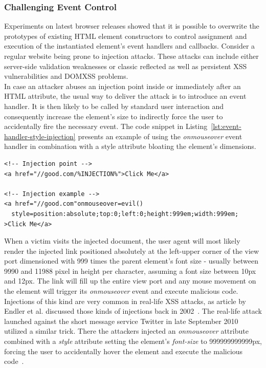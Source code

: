       \subsubsection{Challenging Event Control}
      \label{subsubsubsec:6.6.4.2_event_control}

      Experiments on latest browser releases showed that it is possible to overwrite the prototypes of existing HTML element constructors to control assignment and execution of the instantiated element's event handlers and callbacks. Consider a regular website being prone to injection attacks. These attacks can include either server-side validation weaknesses or classic reflected as well as persistent XSS vulnerabilities and DOMXSS problems. \\

      In case an attacker abuses an injection point inside or immediately after an HTML attribute, the usual way to deliver the attack is to introduce an event handler. It is then likely to be called by standard user interaction and consequently increase the element's size to indirectly force the user to accidentally fire the necessary event. The code snippet in Listing~\ref{lst:event-handler-style-injection} presents an example of using the \textit{onmouseover} event handler in combination with a style attribute bloating the element's dimensions. \\

\begin{lstlisting}[captionpos=b,label=lst:event-handler-style-injection,caption=Example for common event handler and bloating style injections]
<!-- Injection point -->
<a href="//good.com/%INJECTION%">Click Me</a>

<!-- Injection example -->
<a href="//good.com"onmouseover=evil() 
  style=position:absolute;top:0;left:0;height:999em;width:999em;
>Click Me</a>
\end{lstlisting}      

    When a victim visits the injected document, the user agent will most likely render the injected link positioned absolutely at the left-upper corner of the view port dimensioned with 999 times the parent element's font size - usually between 9990 and 11988 pixel in height per character, assuming a font size between 10px and 12px. The link will fill up the entire view port and any mouse movement on the element will trigger its \textit{onmouseover} event and execute malicious code. \\

    Injections of this kind are very common in real-life XSS attacks, as article by Endler et al. discussed those kinds of injections back in 2002~\cite{endler2002evolution}. The real-life attack launched against the short message service Twitter in late September 2010 utilized a similar trick. There the attackers injected an \textit{onmouseover} attribute combined with a \textit{style} attribute setting the element's \textit{font-size} to 999999999999px, forcing the user to accidentally hover the element and execute the malicious code~\cite{stackoverflow_todays_2010}. \\

